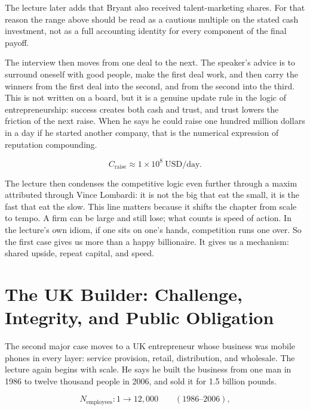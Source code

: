 \begin{remark}
The lecture later adds that Bryant also received talent-marketing shares. For that reason the range above should be read as a cautious multiple on the stated cash investment, not as a full accounting identity for every component of the final payoff.
\end{remark}

The interview then moves from one deal to the next. The speaker's advice is to surround oneself with good people, make the first deal work, and then carry the winners from the first deal into the second, and from the second into the third. This is not written on a board, but it is a genuine update rule in the logic of entrepreneurship: success creates both cash and trust, and trust lowers the friction of the next raise. When he says he could raise one hundred million dollars in a day if he started another company, that is the numerical expression of reputation compounding.

\begin{equation}
C_{\text{raise}} \approx 1 \times 10^{8}\ \mathrm{USD/day}.
\end{equation}

The lecture then condenses the competitive logic even further through a maxim attributed through Vince Lombardi: it is not the big that eat the small, it is the fast that eat the slow. This line matters because it shifts the chapter from scale to tempo. A firm can be large and still lose; what counts is speed of action. In the lecture's own idiom, if one sits on one's hands, competition runs one over. So the first case gives us more than a happy billionaire. It gives us a mechanism: shared upside, repeat capital, and speed.

\section{The UK Builder: Challenge, Integrity, and Public Obligation}

The second major case moves to a UK entrepreneur whose business was mobile phones in every layer: service provision, retail, distribution, and wholesale. The lecture again begins with scale. He says he built the business from one man in 1986 to twelve thousand people in 2006, and sold it for 1.5 billion pounds.

\begin{equation}
N_{\text{employees}} : 1 \longrightarrow 12{,}000
\qquad (1986\text{--}2006),
\end{equation}


